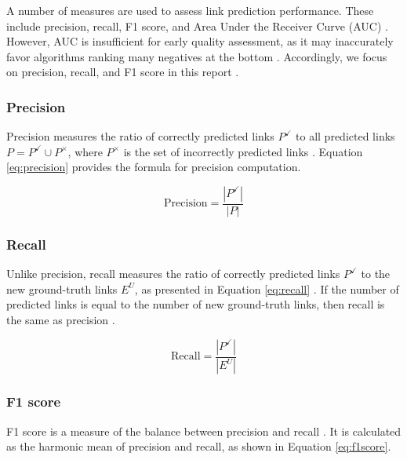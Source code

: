 A number of measures are used to assess link prediction performance. These include precision, recall, F1 score, and Area Under the Receiver Curve (AUC) \cite{arrar2023comprehensive}. However, AUC is insufficient for early quality assessment, as it may inaccurately favor algorithms ranking many negatives at the bottom \cite{zhou2021progresses, yang2015evaluating, lichtnwalter2012link}. Accordingly, we focus on precision, recall, and F1 score in this report \cite{lu2015toward}.


\subsubsection{Precision}

Precision measures the ratio of correctly predicted links $P^\checkmark$ to all predicted links $P = P^\checkmark \cup P^\times$, where $P^\times$ is the set of incorrectly predicted links \cite{arrar2023comprehensive, zhou2021progresses}. Equation \ref{eq:precision} provides the formula for precision computation.

\begin{equation}
\label{eq:precision}
  \text{Precision} = \frac{|P^\checkmark|}{|P|}
\end{equation}


\subsubsection{Recall}

Unlike precision, recall measures the ratio of correctly predicted links $P^\checkmark$ to the new ground-truth links $E^U$, as presented in Equation \ref{eq:recall} \cite{arrar2023comprehensive, zhou2021progresses}. If the number of predicted links is equal to the number of new ground-truth links, then recall is the same as precision \cite{zhou2021progresses, lu2011link, liben2003link}.

\begin{equation}
\label{eq:recall}
  \text{Recall} = \frac{|P^\checkmark|}{|E^U|}
\end{equation}


\subsubsection{F1 score}

F1 score is a measure of the balance between precision and recall \cite{arrar2023comprehensive}. It is calculated as the harmonic mean of precision and recall, as shown in Equation \ref{eq:f1score}.

